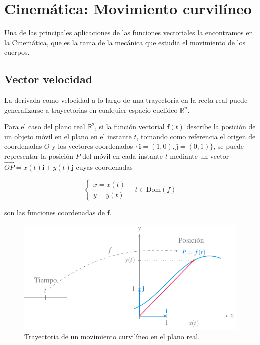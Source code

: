 \documentclass[
  a4paper,
]{scrreport}
\theoremstyle{definition}
\theoremstyle{plain}
\theoremstyle{definition}
\theoremstyle{definition}
\theoremstyle{plain}
\theoremstyle{plain}
\theoremstyle{remark}
\begin{document}
\section{Cinemática: Movimiento
curvilíneo}\label{cinemuxe1tica-movimiento-curviluxedneo}

Una de las principales aplicaciones de las funciones vectoriales la
encontramos en la Cinemática, que es la rama de la mecánica que estudia
el movimiento de los cuerpos.

\subsection{Vector velocidad}\label{vector-velocidad}

La derivada como velocidad a lo largo de una trayectoria en la recta
real puede generalizarse a trayectorias en cualquier espacio euclídeo
\(\mathbb{R}^n\).

Para el caso del plano real \(\mathbb{R}^2\), si la función vectorial
\(\mathbf{f}(t)\) describe la posición de un objeto móvil en el plano en
el instante \(t\), tomando como referencia el origen de coordenadas
\(O\) y los vectores coordenados
\(\{\mathbf{i}=(1,0),\mathbf{j}=(0,1)\}\), se puede representar la
posición \(P\) del móvil en cada instante \(t\) mediante un vector
\(\vec{OP}=x(t)\mathbf{i}+y(t)\mathbf{j}\) cuyas coordenadas

\[
\begin{cases}
x=x(t) \\
y=y(t)
\end{cases}
\quad
t\in \mbox{Dom}(f)
\]

son las funciones coordenadas de \(\mathbf{f}\).

\begin{figure}[H]

{\centering \includegraphics{img/funciones-vectoriales/movimiento-curvilineo-plano.pdf}

}

\caption{Trayectoria de un movimiento curvilíneo en el plano real.}

\end{figure}%
\end{document}

